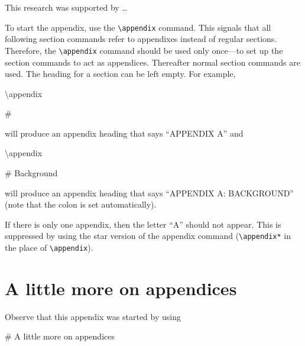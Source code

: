 \documentclass[preprint]{JASA}
\newenvironment{Shaded}{\begin{snugshade}}{\end{snugshade}}
\newcommand{\FunctionTok}[1]{\textcolor[rgb]{0.00,0.00,0.00}{#1}}
\newcommand{\NormalTok}[1]{#1}
\begin{document}
\begin{acknowledgments}

This research was supported by \ldots{}

\end{acknowledgments}

\appendix

To start the appendix, use the \texttt{\textbackslash{}appendix}
command. This signals that all following section commands refer to
appendixes instead of regular sections. Therefore, the
\texttt{\textbackslash{}appendix} command should be used only once---to
set up the section commands to act as appendices. Thereafter normal
section commands are used. The heading for a section can be left empty.
For example,

\begin{Shaded}
\begin{Highlighting}[]
\FunctionTok{\textbackslash{}appendix}

\NormalTok{# }
\end{Highlighting}
\end{Shaded}

will produce an appendix heading that says ``APPENDIX A'' and

\begin{Shaded}
\begin{Highlighting}[]
\FunctionTok{\textbackslash{}appendix}

\NormalTok{# Background}
\end{Highlighting}
\end{Shaded}

will produce an appendix heading that says ``APPENDIX A: BACKGROUND''
(note that the colon is set automatically).

If there is only one appendix, then the letter ``A'' should not appear.
This is suppressed by using the star version of the appendix command
(\texttt{\textbackslash{}appendix*} in the place of
\texttt{\textbackslash{}appendix}).

\hypertarget{a-little-more-on-appendices}{%
\section{A little more on
appendices}\label{a-little-more-on-appendices}}

Observe that this appendix was started by using

\begin{Shaded}
\begin{Highlighting}[]
\FunctionTok{# A little more on appendices}
\end{Highlighting}
\end{Shaded}
\end{document}
